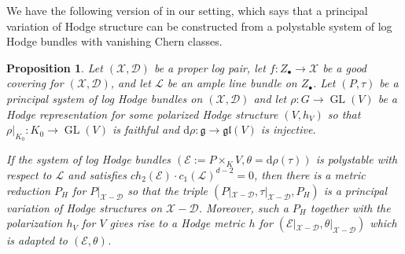 \documentclass[a4paper]{amsart}
\newtheorem{proposition}[theorem]{Proposition}
\theoremstyle{definition}
\def\gl{\mathop{\mathrm{GL}}\nolimits}
\begin{document}
We have the following version of \cite[Theorem 4.1]{dengcadorel} in our setting, which says that a principal variation of Hodge structure can be constructed from a polystable system of log Hodge bundles with vanishing Chern classes.

\begin{proposition}\label{Principal-VHS-prop}
Let $(\mathscr{X},\mathscr{D})$ be a proper log pair, let $f:Z_\bullet\to\mathscr{X}$ be a good covering for $(\mathscr{X},\mathscr{D})$, and let $\mathcal{L}$ be an ample line bundle on $Z_\bullet$. Let $(P,\tau)$ be a principal system of log Hodge bundles on $(\mathscr{X},\mathscr{D})$ and let $\rho:G\to\gl(V)$ be a Hodge representation for some polarized Hodge structure $(V,h_V)$ so that $\rho|_{K_0}:K_0\to \gl(V)$ is faithful and $\mathrm{d}\rho:\mathfrak{g}\to\mathfrak{gl}(V)$ is injective. 

If the system of log Hodge bundles $(\mathcal{E}:=P\times_KV,\theta=\mathrm{d}\rho(\tau))$ is polystable with respect to $\mathcal{L}$ and satisfies $ch_2(\mathcal{E})\cdot c_1(\mathcal{L})^{d-2}=0$, then there is a metric reduction $P_H$ for $P|_{\mathscr{X}-\mathscr{D}}$ so that the triple $(P|_{\mathscr{X}-\mathscr{D}},\tau|_{\mathscr{X}-\mathscr{D}},P_H)$ is a principal variation of Hodge structures on $\mathscr{X}-\mathscr{D}$. Moreover, such a $P_H$ together with the polarization $h_V$ for $V$ gives rise to a Hodge metric $h$ for $(\mathcal{E}|_{\mathscr{X}-\mathscr{D}},\theta|_{\mathscr{X}-\mathscr{D}})$ which is adapted to $(\mathcal{E},\theta)$.
\end{proposition}
\end{document}
